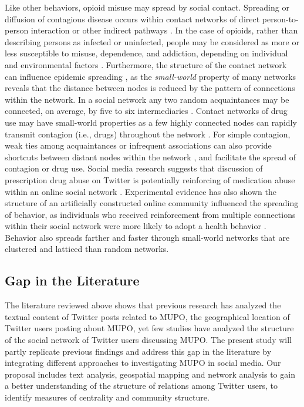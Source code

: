 \documentclass[sigconf]{acmart}
\begin{document}

Like other behaviors, opioid misuse may spread by social contact. Spreading 
or diffusion of contagious disease occurs within contact networks of direct 
person-to-person interaction or other indirect pathways \cite{pastor01}. In 
the case of opioids, rather than describing persons as infected or uninfected, 
people may be considered as more or less susceptible to misuse, dependence, and 
addiction, depending on individual and environmental factors \cite{volkow14}. 
Furthermore, the structure of the contact network can influence epidemic 
spreading \cite{watts98}, as the \emph{small-world} property of many networks 
reveals that the distance between nodes is reduced by the pattern of 
connections within the network. In a social network any two random acquaintances 
may be connected, on average, by five to six intermediaries \cite{travers69}. 
Contact networks of drug use may have small-world properties as a few highly 
connected nodes can rapidly transmit contagion (i.e., drugs) throughout the 
network \cite{shaham03}. For simple contagion, weak ties among acquaintances or 
infrequent associations can also provide shortcuts between distant nodes within 
the network \cite{granovetter73}, and facilitate the spread of contagion or 
drug use. Social media research suggests that discussion of prescription drug 
abuse on Twitter is potentially reinforcing of medication abuse within an 
online social network \cite{hanson13}. Experimental evidence has also shown 
the structure of an artificially constructed online community influenced the 
spreading of behavior, as individuals who received reinforcement from multiple 
connections within their social network were more likely to adopt a health
behavior \cite{centola10}. Behavior also spreads farther and faster through 
small-world networks that are clustered and latticed than random networks.


\subsection{Gap in the Literature} 

The literature reviewed above shows that previous research has analyzed the 
textual content of Twitter posts related to MUPO, the geographical location of 
Twitter users posting about MUPO, yet few studies have analyzed the structure 
of the social network of Twitter users discussing MUPO. The present study will 
partly replicate previous findings and address this gap in the literature by 
integrating different approaches to investigating MUPO in social media. Our 
proposal includes text analysis, geospatial mapping and network analysis to 
gain a better understanding of the structure of relations among Twitter users, 
to identify measures of centrality and community structure. 
\end{document}

